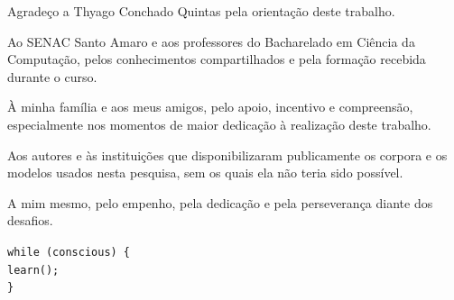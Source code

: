 \documentclass[
    12pt,                %
    openright,           %
    oneside,             %
    a4paper,             %
    english,             %
    brazil               %
]{abntex2}
\begin{document}

\frenchspacing

\pretextual

\imprimircapa

\imprimirfolhaderosto

\begin{agradecimentos}

Agradeço a Thyago Conchado Quintas pela orientação deste trabalho.

Ao SENAC Santo Amaro e aos professores do Bacharelado em Ciência da Computação, pelos conhecimentos compartilhados e pela formação recebida durante o curso.

À minha família e aos meus amigos, pelo apoio, incentivo e compreensão, especialmente nos momentos de maior dedicação à realização deste trabalho.

Aos autores e às instituições que disponibilizaram publicamente os corpora e os modelos usados nesta pesquisa, sem os quais ela não teria sido possível.

A mim mesmo, pelo empenho, pela dedicação e pela perseverança diante dos desafios.

\end{agradecimentos}

\begin{epigrafe}
    \vspace*{\fill}
    \begin{flushright}
        \texttt{while (conscious) \{}\\
        \hspace*{1em}\texttt{learn();}\\
        \texttt{\}}
    \end{flushright}
\end{epigrafe}
\end{document}

